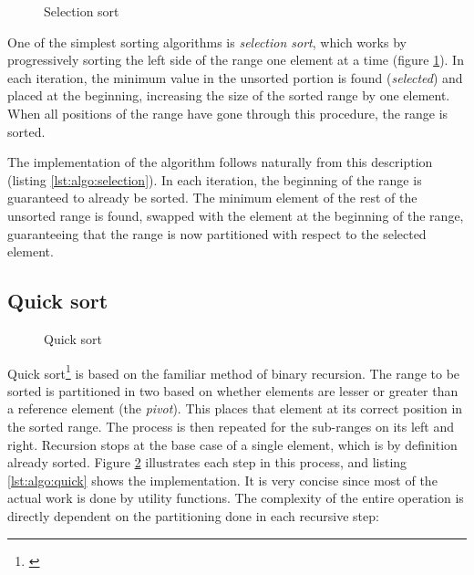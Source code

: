 \begin{figure}[p]
    \centering
    
    \vspace{2\baselineskip}
    
    \caption{Selection sort}
    \label{fig:algo:selection}
\end{figure}

One of the simplest sorting algorithms is \textit{selection sort}, which works
by progressively sorting the left side of the range one element at a time
(figure \ref{fig:algo:selection}).  In each iteration, the minimum value in the
unsorted portion is found (\emph{selected}) and placed at the beginning,
increasing the size of the sorted range by one element.  When all positions of
the range have gone through this procedure, the range is sorted.

The implementation of the algorithm follows naturally from this description
(listing \ref{lst:algo:selection}).  In each iteration, the beginning of the
range is guaranteed to already be sorted.  The minimum element of the rest of
the unsorted range is found, swapped with the element at the beginning of the
range, guaranteeing that the range is now partitioned with respect to the
selected element.

\subsection{Quick sort}

\begin{figure}[p]
    \centering
    
    \vspace{2\baselineskip}
    
    \caption{Quick sort}
    \label{fig:algo:quick}
\end{figure}

Quick sort\footnote{\cite{Hoare1962}} is based on the familiar method of binary
recursion.  The range to be sorted is partitioned in two based on whether
elements are lesser or greater than a reference element (the \textit{pivot}).
This places that element at its correct position in the sorted range.  The
process is then repeated for the sub-ranges on its left and right.  Recursion
stops at the base case of a single element, which is by definition already
sorted.  Figure \ref{fig:algo:quick} illustrates each step in this
process\footnotemark, and listing \ref{lst:algo:quick} shows the implementation.
It is very concise since most of the actual work is done by utility functions.
The complexity of the entire operation is directly dependent on the partitioning
done in each recursive step:

